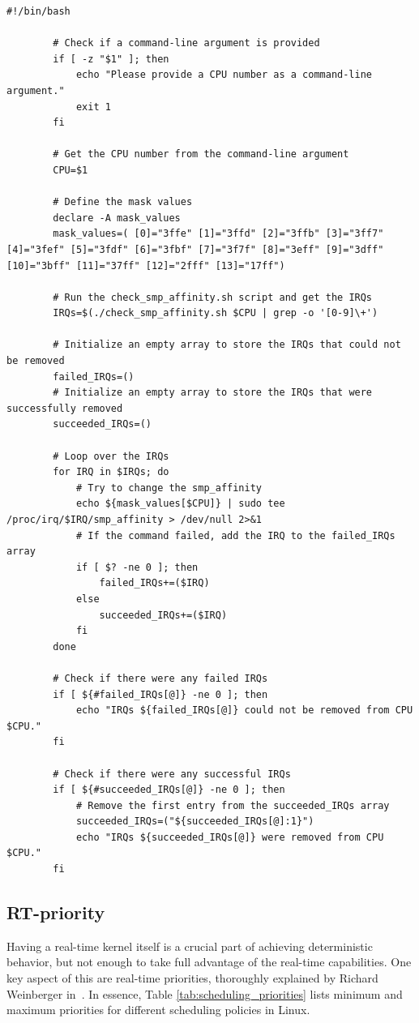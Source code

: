\documentclass[MMR,Master,english]{twbook}
\begin{document}
\vspace{1em}
\begin{minipage}{0.95\columnwidth}
	\begin{lstlisting}[name={Change IRQ assignment of a CPU},label={script:change_smp_affinity}]
		#!/bin/bash

		# Check if a command-line argument is provided
		if [ -z "$1" ]; then
			echo "Please provide a CPU number as a command-line argument."
			exit 1
		fi
		
		# Get the CPU number from the command-line argument
		CPU=$1
		
		# Define the mask values
		declare -A mask_values
		mask_values=( [0]="3ffe" [1]="3ffd" [2]="3ffb" [3]="3ff7" [4]="3fef" [5]="3fdf" [6]="3fbf" [7]="3f7f" [8]="3eff" [9]="3dff" [10]="3bff" [11]="37ff" [12]="2fff" [13]="17ff")
		
		# Run the check_smp_affinity.sh script and get the IRQs
		IRQs=$(./check_smp_affinity.sh $CPU | grep -o '[0-9]\+')
		
		# Initialize an empty array to store the IRQs that could not be removed
		failed_IRQs=()
		# Initialize an empty array to store the IRQs that were successfully removed
		succeeded_IRQs=()
		
		# Loop over the IRQs
		for IRQ in $IRQs; do
			# Try to change the smp_affinity
			echo ${mask_values[$CPU]} | sudo tee /proc/irq/$IRQ/smp_affinity > /dev/null 2>&1
			# If the command failed, add the IRQ to the failed_IRQs array
			if [ $? -ne 0 ]; then
				failed_IRQs+=($IRQ)
			else
				succeeded_IRQs+=($IRQ)
			fi
		done
		
		# Check if there were any failed IRQs
		if [ ${#failed_IRQs[@]} -ne 0 ]; then
			echo "IRQs ${failed_IRQs[@]} could not be removed from CPU $CPU."
		fi
		
		# Check if there were any successful IRQs
		if [ ${#succeeded_IRQs[@]} -ne 0 ]; then
			# Remove the first entry from the succeeded_IRQs array
			succeeded_IRQs=("${succeeded_IRQs[@]:1}")
			echo "IRQs ${succeeded_IRQs[@]} were removed from CPU $CPU."
		fi		
\end{lstlisting}
\end{minipage}
\subsection{RT-priority} 
Having a real-time kernel itself is a crucial part of achieving deterministic behavior, but not enough to take full advantage of the real-time capabilities. One key aspect of this are real-time priorities, thoroughly explained by Richard Weinberger in~\cite{LinuxProcessPriorities}. In essence, Table \ref{tab:scheduling_priorities} lists minimum and maximum priorities for different scheduling policies in Linux.
\end{document}
